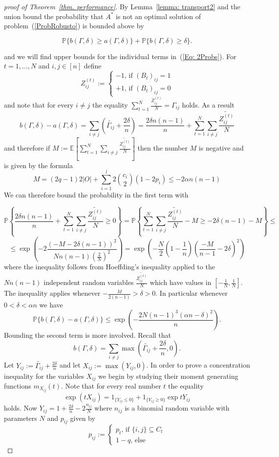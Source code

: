 \documentclass[12pt]{amsart}
\theoremstyle{remark}
\newcommand{\PP}{\mathbb{P}}
\newcommand{\EE}{\mathbb{E}}
\begin{document}
\begin{proof} [proof of Theorem~\ref{thm. performance}]By Lemma~\ref{lemma: transport2} and the union bound the probability that $A^*$ is not an optimal solution of problem~(\ref{ProbRobusto}) is bounded above by

\begin{equation}\label{Eq: 2Probs}
\PP\{b(\Gamma,\delta)\geq a(\Gamma,\delta)\}+\PP\{b(\Gamma,\delta)\geq \delta\}.
\end{equation}

and we will find upper bounds for the individual terms in~(\ref{Eq: 2Probs}). 
For $t=1,\dots, N$ and $i,j\in [n]$ define 
\[Z^{(t)}_{ij}:=\begin{cases}
-1\text{, if $(B_t)_{ij}=1$}\\
+1\text{, if $(B_t)_{ij}=0$}
\end{cases}\]
and note that for every $i\neq j$ the equality $\sum_{t=1}^N\frac{Z_{ij}^{(t)}}{N} = \Gamma_{ij}$ holds. As a result
\[b(\Gamma,\delta)-a(\Gamma,\delta) = \sum_{i\neq j} \left(\widetilde{\Gamma_{ij}}+\frac{2\delta}{n}\right)= \frac{2\delta n(n-1)}{n} + \sum_{t=1}^N \sum_{i\neq j} \frac{\widetilde{Z^{(t)}_{ij}}}{N}\]
and therefore if $M:=\EE\left[\sum_{t=1}^N \sum_{i\neq j} \frac{\widetilde{Z^{(t)}_{ij}}}{N}\right]$ then the number $M$ is negative and is given by the formula
\[M=(2q-1)2|O|+\sum_{i=1}^l 2\binom{c_i}{2} (1-2p_i)\leq -2\alpha n(n-1)\]  
We can therefore bound the probability in the first term with
 
\[\PP\left\{\frac{2\delta n(n-1)}{n} + \sum_{t=1}^N \sum_{i\neq j} \frac{\widetilde{Z^{(t)}_{ij}}}{N}\geq 0\right\} = \PP\left\{\sum_{t=1}^N \sum_{i\neq j} \frac{\widetilde{Z^{(t)}_{ij}}}{N} - M \geq -2\delta (n-1) - M \right\}\leq\]
\[\leq \exp\left(-2\frac{(-M-2\delta(n-1))^2}{Nn(n-1)(\frac{2}{N})^2}\right)=\exp\left( -\frac{N}{2}\left(1-\frac{1}{n}\right) \left(\frac{-M}{n-1}-2\delta\right)^2\right) \]
where the inequality follows from Hoeffding's inequality applied to the $Nn(n-1)$ independent random variables $\frac{\widetilde{Z_{ij}^{(t)}}}{N}$ which have values in $\left[-\frac{1}{N},\frac{1}{N}\right]$. The inequality applies whenever $-\frac{M}{2(n-1)}>\delta>0$. In particular whenever $0<\delta<\alpha n$ we have
\[\PP\{b(\Gamma,\delta)-a(\Gamma,\delta)\}\leq \exp\left(-\frac{2N(n-1)^3(\alpha n-\delta)^2}{n}\right).\]
Bounding the second term is more involved. Recall that
\[b(\Gamma,\delta)=\sum_{i\neq j} \max\left(\widetilde{\Gamma_{ij}}+\frac{2\delta}{n},0\right).\]
Let $Y_{ij}:=\widetilde{\Gamma_{ij}}+\frac{2\delta}{n}$ and let $X_{ij}:=\max\left(Y_{ij},0\right)$. In order to prove a concentration inequality for the variables $X_{ij}$ we begin by studying their moment generating functions $m_{X_{ij}}(t)$. Note that for every real number $t$ the equality
\[\exp(tX_{ij})= 1_{\{Y_{ij}\leq 0\}} + 1_{\{Y_{ij}\geq 0\}} \exp tY_{ij}\]
holds. Now $Y_{ij}=1+\frac{2\delta}{n}-2\frac{n_{ij}}{N}$ where $n_{ij}$ is a binomial random variable with parameters $N$ and $p_{ij}$ given by
\[
p_{ij}:=\begin{cases}
p_t\text{, if $\{i,j\}\subseteq C_t$}\\
1-q\text{, else}
\end{cases}
\]



\end{proof}
\end{document}
